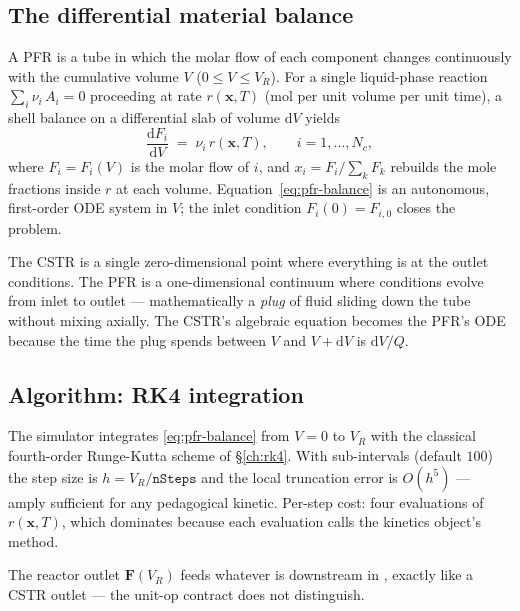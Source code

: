 \documentclass[11pt,a4paper]{article}
\newcommand{\xv}{\mathbf{x}}
\newcommand{\Fv}{\mathbf{F}}
\begin{document}
\subsection{The differential material balance}

A PFR is a tube in which the molar flow of each component changes
continuously with the cumulative volume $V$ ($0 \le V \le V_R$). For a
single liquid-phase reaction $\sum_i \nu_i \, A_i = 0$ proceeding at
rate $r(\xv, T)$ (mol per unit volume per unit time), a shell balance
on a differential slab of volume $\mathrm{d}V$ yields
\begin{equation}
   \boxed{\;
   \frac{\mathrm{d}F_i}{\mathrm{d}V} \;=\; \nu_i \, r(\xv, T),
   \qquad i = 1, \dots, N_c,
   \;}
   \label{eq:pfr-balance}
\end{equation}
where $F_i = F_i(V)$ is the molar flow of $i$, and
$x_i = F_i / \sum_k F_k$ rebuilds the mole fractions inside $r$ at
each volume. Equation~\eqref{eq:pfr-balance} is an autonomous,
first-order ODE system in $V$; the inlet condition
$F_i(0) = F_{i,0}$ closes the problem.

\begin{intuition}
The CSTR is a single zero-dimensional point where everything is at
the outlet conditions. The PFR is a one-dimensional continuum where
conditions evolve from inlet to outlet --- mathematically a
\emph{plug} of fluid sliding down the tube without mixing axially.
The CSTR's algebraic equation becomes the PFR's ODE because the time
the plug spends between $V$ and $V + \mathrm{d}V$ is $\mathrm{d}V/Q$.
\end{intuition}

\subsection{Algorithm: RK4 integration}

The simulator integrates \eqref{eq:pfr-balance} from $V = 0$ to
$V_R$ with the classical fourth-order Runge-Kutta scheme of
\S\ref{ch:rk4}. With  sub-intervals
(default $100$) the step size is $h = V_R / \texttt{nSteps}$ and the
local truncation error is $O(h^5)$ --- amply sufficient for any
pedagogical kinetic. Per-step cost: four evaluations of
$r(\xv, T)$, which dominates because each evaluation calls the
kinetics object's  method.

The reactor outlet $\Fv(V_R)$ feeds whatever is downstream in
, exactly like a CSTR outlet --- the unit-op
contract does not distinguish.
\end{document}
